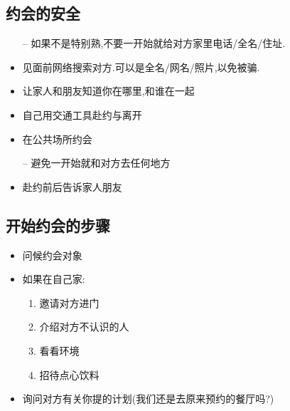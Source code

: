 \documentclass[UTF8]{article}
\newcommand{\dash}{–}
\begin{document}
\subsection{约会的安全}
\begin{itemize}
    \item[\dash] 如果不是特别熟,不要一开始就给对方家里电话/全名/住址.
    \item 见面前网络搜索对方.可以是全名/网名/照片,以免被骗.
    \item 让家人和朋友知道你在哪里,和谁在一起
    \item 自己用交通工具赴约与离开
    \item 在公共场所约会
    \item[\dash] 避免一开始就和对方去任何地方
    \item 赴约前后告诉家人朋友
\end{itemize}

\subsection{开始约会的步骤}
\begin{itemize}
    \item 问候约会对象
    \item 如果在自己家:\begin{enumerate}[label=(\arabic*)]
        \item 邀请对方进门
        \item 介绍对方不认识的人
        \item 看看环境
        \item 招待点心饮料
    \end{enumerate}
    \item 询问对方有关你提的计划(我们还是去原来预约的餐厅吗?)
\end{itemize}
\end{document}
